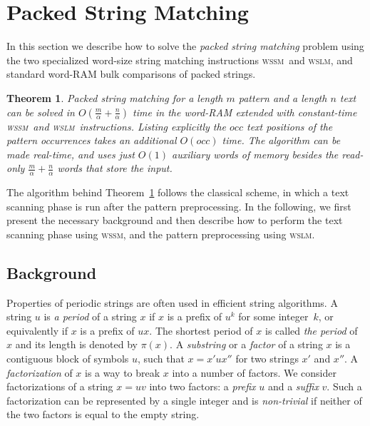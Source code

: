 \documentclass[12pt]{article}
\newtheorem{theorem}{Theorem}[section]
\newcommand{\comment}[1]{}
\newcommand{\C}{{\alpha}}
\newcommand{\occ}{{\mathit{occ}}}
\newcommand{\wssm}{\textsc{wssm}}
\newcommand{\wslm}{\textsc{wslm}}
\begin{document}
\section{Packed String Matching}
\label{sec:packed-string-matching}

In this section we describe how to solve the {\em packed string
  matching} problem 
  using the two specialized word-size string matching instructions \wssm\ and \wslm,
  and standard word-RAM bulk comparisons of packed strings. 

\comment{
In this section we describe a reduction from {\em Packed String
  Matching} to the two string matching problems on word-sized strings.
We will discuss \wssm\ and \wslm\ in more detail in
Section~\ref{sec:word-size-string-matching}. Our contribution in this
section is to show that the complexity of packed string matching in
the word-RAM reduces to that of \wssm\ and \wslm\ as stated by  the following.}

\begin{theorem}
  \label{the:main_1}
  Packed string matching for a length $m$ pattern and a length $n$ text 
  can be solved in $O( \frac{m}{\C} + \frac{n}{\C}) $
  time in the word-RAM extended with constant-time \wssm\ and \wslm\
  instructions. Listing explicitly the $\occ$ text positions of
  the pattern occurrences takes an additional $O(\occ)$ time.  The
  algorithm can be made real-time, and uses just $O(1)$ auxiliary
  words of memory besides the read-only $ \frac{m}{\C} + \frac{n}{\C}$ words
  that store the input.
\end{theorem}

The algorithm behind Theorem~\ref{the:main_1} follows the classical
scheme, in which a text scanning phase is run after the pattern
preprocessing. In the following, we first present the necessary background
and then describe how to perform the text scanning phase using \wssm,
and the pattern preprocessing using \wslm.

\subsection{Background}
\label{sub:notions-terminology}

\smallskip{} 
%
Properties of periodic strings are often used in efficient string
algorithms.  A string $u$ is {\em a period} of
a string $x$ if $x$ is a prefix of $u^k$ for some integer~$k$, or
equivalently if $x$ is a prefix of $ux$.  The shortest period of $x$
is called {\em the period} of $x$ and its length is denoted by
$\pi(x)$. A {\em substring} or a {\em factor} of a string $x$ is a
contiguous block of symbols $u$, such that $x=x'ux''$ for two strings
$x'$ and $x''$. A {\em factorization} of $x$ is a way to break $x$
into a number of factors.  We consider factorizations of a
string $x=uv$ into two factors: a {\em prefix} $u$ and a {\em suffix}
$v$.  Such a factorization can be represented by a single integer and
is {\em non-trivial} if neither of the two factors is equal to the
empty string.
\end{document}
